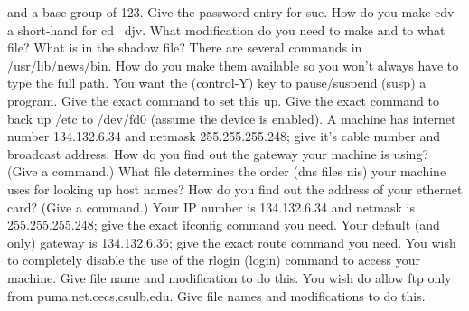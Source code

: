 and a base group of {\ltt{}123}.
Give the password entry for {\ltt{}sue}.
\vskip 1.4in
\ques
How do you make {\ltt{}cdv} a short-hand for {\ltt{}cd ~djv}.
What modification do you need to make and to what file?
\vskip 1.0in
What is in the shadow file?
\vskip 1.0in
There are several commands in {\ltt{}/usr/lib/news/bin}.
How do you make them available so you won't always have to type the full path.
\vskip 1.2in
\vfill\eject
\ques
You want the ({\ltt{}control-Y}) key to pause/suspend (susp)
a program. Give the exact command to set this up.
\vskip 0.4in
Give the exact command to back up {\ltt{}/etc} to {\ltt{}/dev/fd0}
(assume the device is enabled).
\vskip 0.4in
\ques
A machine has internet number {\ltt{}134.132.6.34} and
netmask {\ltt{}255.255.255.248}; give it's cable number and broadcast address.
\vskip 1.0in
How do you find out the gateway your machine is using?  (Give a command.)
\vskip 0.4in
What file determines the order (dns files nis) your machine uses for
looking up host names?
\vskip 0.4in
How do you find out the address of your ethernet card?
(Give a command.)
\vskip 0.4in
\ques
Your IP number is {\ltt{}134.132.6.34} and netmask is {\ltt{}255.255.255.248};
give the exact {\ltt{}ifconfig} command you need.
\vskip 0.4in
Your default (and only) gateway is {\ltt{}134.132.6.36};
give the exact {\ltt{}route} command you need.
\vskip 0.4in
You wish to completely disable the use of the {\ltt{}rlogin} ({\ltt{}login})
command to access your machine.
Give file name and modification to do this.
\vskip 0.8in
You wish do allow {\ltt{}ftp} only from {\ltt{}puma.net.cecs.csulb.edu}.
Give file names and modifications to do this.
\vskip 1.4in
\bye
